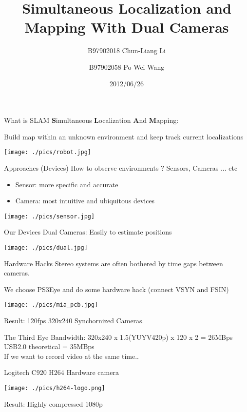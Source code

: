 \documentclass{beamer}
\title{Simultaneous Localization and Mapping With Dual Cameras}
\author{B97902018 Chun-Liang Li \and 
	B97902058 Po-Wei Wang}
\date{2012/06/26}
\begin{document}
	\begin{frame}
		\titlepage
	\end{frame}

	\begin{frame}{What is SLAM}
		\textbf{S}imultaneous \textbf{L}ocalization \textbf{A}nd \textbf{M}apping: 
		
		Build map within an unknown environment and keep track current localizations
		\begin{center}
			\texttt{[image: ./pics/robot.jpg]} 
		\end{center}
	\end{frame}

	\begin{frame}{ Approaches (Devices) }
		How to observe environments ? Sensors, Cameras ... etc\\
		\begin{itemize}
			\item Sensor: more specific and accurate
			\item Camera: most intuitive and ubiquitous devices
		\end{itemize}
		\begin{center}
			\texttt{[image: ./pics/sensor.jpg]} 
		\end{center}
	\end{frame}
	
	\begin{frame}{Our Devices}
			Dual Cameras: Easily to estimate positions
			\begin{center}
				\texttt{[image: ./pics/dual.jpg]} 
			\end{center}
	\end{frame}

	\begin{frame}{Hardware Hacks}
		Stereo systems are often bothered by time gaps between cameras.\\
		\uncover<2->
		{
			We choose PS3Eye and do some hardware hack (connect VSYN and FSIN)
			\begin{center}
				\texttt{[image: ./pics/mia\_pcb.jpg]} 
			\end{center}
			Result: 120fps 320x240 Synchornized Cameras.
		}
	\end{frame}

	\begin{frame}{The Third Eye}
		Bandwidth: 320x240 x 1.5(YUYV420p) x 120 x 2 = 26MBps\\
		USB2.0 theoretical = 35MBps\\
		If we want to record video at the same time..\\
		\uncover<2->
		{
			Logitech C920 H264 Hardware camera\\
			\begin{center}
				\texttt{[image: ./pics/h264-logo.png]} 
			\end{center}
			Result: Highly compressed 1080p
		}
	\end{frame}
\end{document}
